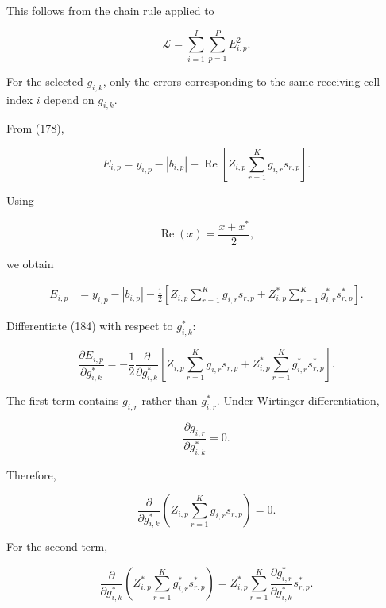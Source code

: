 \documentclass[12pt,a4paper]{article}
\begin{document}
This follows from the chain rule applied to

\begin{equation}
\mathcal{L}
=
\sum_{i=1}^{I}
\sum_{p=1}^{P}
E_{i,p}^{2}.
\tag{181}
\end{equation}

For the selected $g_{i,k}$, only the errors corresponding to the same receiving-cell index $i$ depend on $g_{i,k}$.

From (178),

\begin{equation}
E_{i,p}
=
y_{i,p}
-
|b_{i,p}|
-
\operatorname{Re}
\left[
Z_{i,p}
\sum_{r=1}^{K}
g_{i,r}s_{r,p}
\right].
\tag{182}
\end{equation}

Using

\begin{equation}
\operatorname{Re}(x)
=
\frac{x+x^*}{2},
\tag{183}
\end{equation}

we obtain

\begin{align}
E_{i,p}
&=
y_{i,p}
-
|b_{i,p}|
-
\frac{1}{2}
\left[
Z_{i,p}
\sum_{r=1}^{K}
g_{i,r}s_{r,p}
+
Z_{i,p}^{*}
\sum_{r=1}^{K}
g_{i,r}^{*}s_{r,p}^{*}
\right].
\tag{184}
\end{align}

Differentiate (184) with respect to $g_{i,k}^{*}$:

\begin{equation}
\frac{\partial E_{i,p}}
{\partial g_{i,k}^{*}}
=
-\frac{1}{2}
\frac{\partial}
{\partial g_{i,k}^{*}}
\left[
Z_{i,p}
\sum_{r=1}^{K}
g_{i,r}s_{r,p}
+
Z_{i,p}^{*}
\sum_{r=1}^{K}
g_{i,r}^{*}s_{r,p}^{*}
\right].
\tag{185}
\end{equation}

The first term contains $g_{i,r}$ rather than $g_{i,r}^{*}$. Under Wirtinger differentiation,

\begin{equation}
\frac{\partial g_{i,r}}
{\partial g_{i,k}^{*}}
=
0.
\tag{186}
\end{equation}

Therefore,

\begin{equation}
\frac{\partial}
{\partial g_{i,k}^{*}}
\left(
Z_{i,p}
\sum_{r=1}^{K}
g_{i,r}s_{r,p}
\right)
=
0.
\tag{187}
\end{equation}

For the second term,

\begin{equation}
\frac{\partial}
{\partial g_{i,k}^{*}}
\left(
Z_{i,p}^{*}
\sum_{r=1}^{K}
g_{i,r}^{*}s_{r,p}^{*}
\right)
=
Z_{i,p}^{*}
\sum_{r=1}^{K}
\frac{\partial g_{i,r}^{*}}
{\partial g_{i,k}^{*}}
s_{r,p}^{*}.
\tag{188}
\end{equation}
\end{document}
